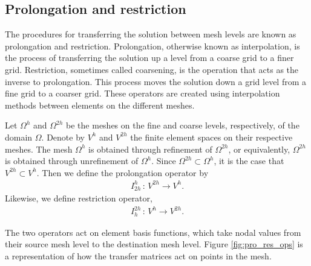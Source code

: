 \subsection{Prolongation and restriction}

The procedures for transferring the solution between mesh levels are known as prolongation and restriction.
Prolongation, otherwise known as interpolation, is the process of transferring the solution up a level from a coarse grid to a finer grid.
Restriction, sometimes called coarsening, is the operation that acts as the inverse to prolongation.
This process moves the solution down a grid level from a fine grid to a coarser grid.
These operators are created using interpolation methods between elements on the different meshes.

Let $\Omega^h$ and $\Omega^{2h}$ be the meshes on the fine and coarse levels, respectively, of the domain $\Omega$.
Denote by $V^{h}$ and $V^{2h}$ the finite element spaces on their respective meshes.
The mesh $\Omega^{h}$ is obtained through refinement of $\Omega^{2h}$, or equivalently, $\Omega^{2h}$ is obtained through unrefinement of $\Omega^{h}$.
Since $\Omega^{2h}\subset \Omega^{h}$, it is the case that $V^{2h}\subset V^h$.
Then we define the prolongation operator by
\begin{align}
	I^h_{2h} \, : \, V^{2h} \rightarrow V^h.
\end{align}
Likewise, we define restriction operator,
\begin{align}
	I^{2h}_h \, : \, V^{h} \rightarrow V^{2h}.
\end{align}

The two operators act on element basis functions, which take nodal values from their source mesh level to the destination mesh level.
Figure \ref{fig:pro_res_ops} is a representation of how the transfer matrices act on points in the mesh.

